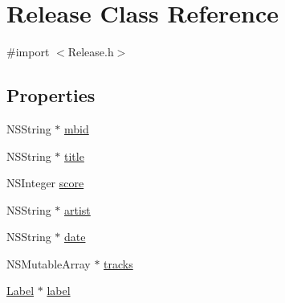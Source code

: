 \hypertarget{interface_release}{\section{Release Class Reference}
\label{interface_release}
}


{\ttfamily \#import $<$Release.\-h$>$}

\subsection*{Properties}
\begin{DoxyCompactItemize}
\item 
N\-S\-String $\ast$ \hyperlink{interface_release_af11f88dfd921a09ce640613b1a33b93f}{mbid}
\item 
N\-S\-String $\ast$ \hyperlink{interface_release_abfa81ba92436b317726d7a0160e09fb7}{title}
\item 
N\-S\-Integer \hyperlink{interface_release_a6f4586ee3cee6aee513928922d856887}{score}
\item 
N\-S\-String $\ast$ \hyperlink{interface_release_af57c5b436e6f1984c7d65333f04e3e61}{artist}
\item 
N\-S\-String $\ast$ \hyperlink{interface_release_a073883f9dca961abb2b895ce1e6b02fa}{date}
\item 
N\-S\-Mutable\-Array $\ast$ \hyperlink{interface_release_a4ea308c448881c31359654ce9b433551}{tracks}
\item 
\hyperlink{interface_label}{Label} $\ast$ \hyperlink{interface_release_ad7491be727818e1b9b4a25d63ec12086}{label}
\end{DoxyCompactItemize}


